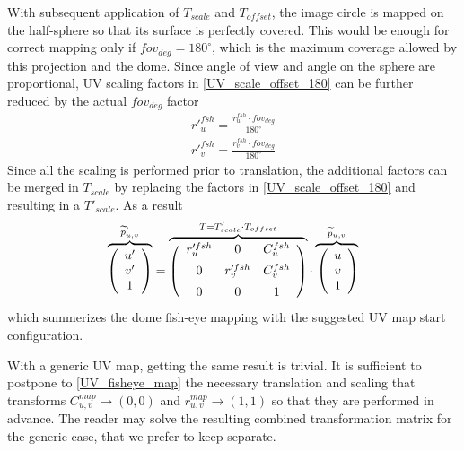 With subsequent application of $T_{scale}$ and $T_{offset}$, the image circle is mapped on the half-sphere so that its surface is perfectly covered. This would be enough for correct mapping only if $fov_{deg} = 180^{\circ}$, which is the maximum coverage allowed by this projection and the dome. Since angle of view and angle on the sphere are proportional, UV scaling factors in \ref{UV_scale_offset_180} can be further reduced by the actual $fov_{deg}$ factor
\begin{equation}
\begin{array}{c}
r'^{fsh}_{u}=\frac{r^{fsh}_{u} \cdot fov_{deg}}{180^{\circ}}\\[0.6em]
r'^{fsh}_{v}=\frac{r^{fsh}_{v} \cdot fov_{deg}}{180^{\circ}}
\end{array}
\end{equation}
Since all the scaling is performed prior to translation, the additional factors can be merged in $T_{scale}$ by replacing the factors in \ref{UV_scale_offset_180} and resulting in a $T'_{scale}$.
As a result
\begin{equation}
\overbrace{
\left(\begin{array}{c}
u'\\
v'\\
1
\end{array}\right)
}^{\widetilde p'_{u,v}}=
\overbrace{
\left( \begin{array}{ccc}
r'^{fsh}_{u} & 0 & C^{fsh}_{u}\\[0.5em]
0 & r'^{fsh}_{v} & C^{fsh}_{v}\\[0.5em]
0 & 0 & 1
\end{array} \right)
}^{T=T'_{scale} \cdot T_{offset}}
 \cdot 
\xoverbrace{
\left(
\begin{array}{c}
u\\
v\\
1
\end{array}
\right)
}^{\widetilde p_{u,v}}
\label{UV_fisheye_map}
\end{equation}
which summerizes the dome fish-eye mapping with the suggested UV map start configuration.

With a generic UV map, getting the same result is trivial. It is sufficient to postpone to \ref{UV_fisheye_map} the necessary translation and scaling that transforms $C^{map}_{u,v} \longrightarrow (0,0)$ and $r^{map}_{u,v} \longrightarrow (1,1)$ so that they are performed in advance. The reader may solve the resulting combined transformation matrix for the generic case, that we prefer to keep separate.

